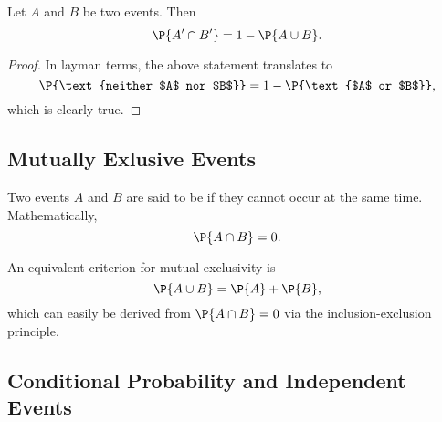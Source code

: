 \begin{proposition}
    Let $A$ and $B$ be two events. Then \[\P{A' \cap B'} = 1 - \P{A \cup B}.\]
\end{proposition}
\begin{proof}
    In layman terms, the above statement translates to \[\P{\text{neither $A$ nor $B$}} = 1 - \P{\text{$A$ or $B$}},\] which is clearly true.
\end{proof}

\subsection{Mutually Exlusive Events}

\begin{definition}
    Two events $A$ and $B$ are said to be  if they cannot occur at the same time. Mathematically, \[\P{A \cap B} = 0.\]
\end{definition}

An equivalent criterion for mutual exclusivity is \[\P{A \cup B} = \P{A} + \P{B},\] which can easily be derived from $\P{A \cap B} = 0$ via the inclusion-exclusion principle.

\subsection{Conditional Probability and Independent Events}

